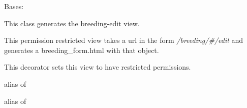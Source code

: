 \documentclass[letterpaper,10pt,english]{sphinxmanual}
\begin{document}
\begin{fulllineitems}
\label{api:mousedb.animal.views.BreedingUpdate}
Bases: \href{http://docs.djangoproject.com/en/dev/ref/class-based-views/\#django.views.generic.edit.UpdateView}{}

This class generates the breeding-edit view.

This permission restricted view takes a url in the form \emph{/breeding/\#/edit} and generates a breeding\_form.html with that object.

\begin{fulllineitems}
\label{api:mousedb.animal.views.BreedingUpdate.context_object_name}
\end{fulllineitems}


\begin{fulllineitems}
\label{api:mousedb.animal.views.BreedingUpdate.dispatch}
This decorator sets this view to have restricted permissions.

\end{fulllineitems}


\begin{fulllineitems}
\label{api:mousedb.animal.views.BreedingUpdate.form_class}
alias of 

\end{fulllineitems}


\begin{fulllineitems}
\label{api:mousedb.animal.views.BreedingUpdate.model}
alias of 

\end{fulllineitems}


\begin{fulllineitems}
\label{api:mousedb.animal.views.BreedingUpdate.template_name}
\end{fulllineitems}


\end{fulllineitems}
\end{document}
